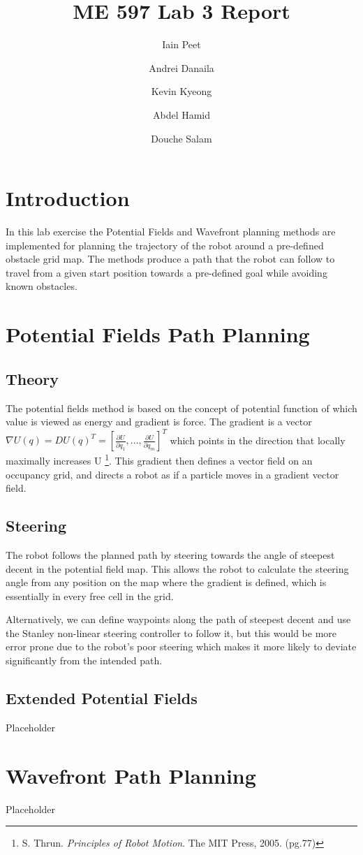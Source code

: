 \documentclass[11pt]{article} %
\title{ME 597 Lab 3 Report}
\author{Iain Peet \and Andrei Danaila \and Kevin Kyeong \and Abdel Hamid \and Douche Salam}
\begin{document}
\maketitle

\clearpage

\section{Introduction}
In this lab exercise the Potential Fields and Wavefront planning methods are implemented for planning the trajectory of the robot around a pre-defined obstacle grid map. The methods produce a path that the robot can follow to travel from a given start position towards a pre-defined goal while avoiding known obstacles.

\section{Potential Fields Path Planning}
\subsection{Theory}
The potential fields method is based on the concept of potential function of which value is viewed as energy and gradient is force.  The gradient is a vector $\nabla U(q) = DU(q)^T = [\frac{\partial U}{\partial q_1}, . . . , \frac{\partial U}{\partial q_m}]^T$ which points in the direction that locally maximally increases U \footnote{S. Thrun. \emph{Principles of Robot Motion}. The MIT Press, 2005. (pg.77)}.  This gradient then defines a vector field on an occupancy grid, and directs a robot as if a particle moves in a gradient vector field.

\subsection{Steering}
The robot follows the planned path by steering towards the angle of steepest decent in the potential field map. This allows the robot to calculate the steering angle from any position on the map where the gradient is defined, which is essentially in every free cell in the grid.

Alternatively, we can define waypoints along the path of steepest decent and use the Stanley non-linear steering controller to follow it, but this would be more error prone due to the robot's poor steering which makes it more likely to deviate significantly from the intended path.

\subsection{Extended Potential Fields}
Placeholder

\section{Wavefront Path Planning}
Placeholder
\end{document}
